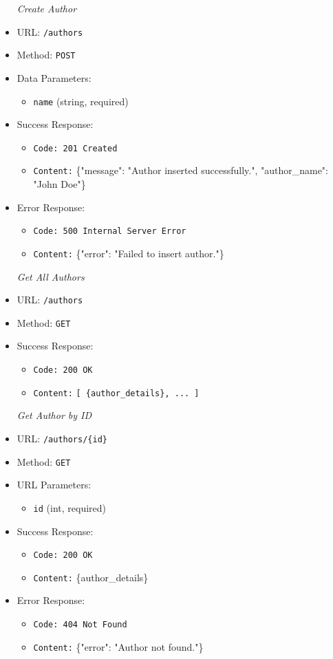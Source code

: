 \begin{itemize}
\item[\textit{Create Author}]
\item URL: \texttt{/authors}  
\item Method: \texttt{POST}  
\item Data Parameters:
\begin{itemize}
  \item \texttt{name} (string, required)
\end{itemize}
\item Success Response:
\begin{itemize}
  \item \texttt{Code: 201 Created}  
  \item \texttt{Content:} \{"message": "Author inserted successfully.", "author\_name": "John Doe"\}
\end{itemize}
\item Error Response:
\begin{itemize}
  \item \texttt{Code: 500 Internal Server Error}  
  \item \texttt{Content:} \{"error": "Failed to insert author."\}
\end{itemize}

\item[\textit{Get All Authors}] 
\item URL: \texttt{/authors}  
\item Method: \texttt{GET}  
\item Success Response:
\begin{itemize}
  \item \texttt{Code: 200 OK}  
  \item \texttt{Content:} \texttt{[ \{author\_details\}, ... ]}
\end{itemize}

\item[\textit{Get Author by ID}] 
\item URL: \texttt{/authors/\{id\}}  
\item Method: \texttt{GET}  
\item URL Parameters:
\begin{itemize}
  \item \texttt{id} (int, required)
\end{itemize}
\item Success Response:
\begin{itemize}
  \item \texttt{Code: 200 OK}  
  \item \texttt{Content:} \{author\_details\}
\end{itemize}
\item Error Response:
\begin{itemize}
  \item \texttt{Code: 404 Not Found}  
  \item \texttt{Content:} \{"error": "Author not found."\}
\end{itemize}


\end{itemize}
